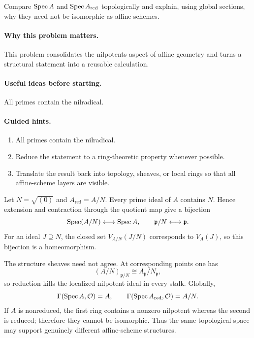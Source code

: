 \begin{problem}\label{prob:vi18-p11}
Compare $\operatorname{Spec} A$ and $\operatorname{Spec} A_{\mathrm{red}}$ topologically and explain, using global sections, why they need not be isomorphic as affine schemes.
\end{problem}

\ifdefined\FullProblemDossiers
\paragraph{Why this problem matters.}
This problem consolidates the nilpotents aspect of affine geometry and turns a structural statement into a reusable calculation.

\paragraph{Useful ideas before starting.}
All primes contain the nilradical.

\paragraph{Guided hints.}
\begin{enumerate}
\item All primes contain the nilradical.
\item Reduce the statement to a ring-theoretic property whenever possible.
\item Translate the result back into topology, sheaves, or local rings so that all affine-scheme layers are visible.
\end{enumerate}

\begin{solution}
Let $N=\sqrt{(0)}$ and $A_{\mathrm{red}}=A/N$. Every prime ideal of $A$ contains $N$. Hence extension and contraction through the quotient map give a bijection
\[
\operatorname{Spec}(A/N)\longleftrightarrow\operatorname{Spec} A,
\qquad
\mathfrak p/N\longleftrightarrow\mathfrak p.
\]
For an ideal $J\supseteq N$, the closed set $V_{A/N}(J/N)$ corresponds to $V_A(J)$, so this bijection is a homeomorphism.

The structure sheaves need not agree. At corresponding points one has
\[
(A/N)_{\mathfrak p/N}\cong A_{\mathfrak p}/N_{\mathfrak p},
\]
so reduction kills the localized nilpotent ideal in every stalk. Globally,
\[
\Gamma(\operatorname{Spec} A,\mathcal O)=A,
\qquad
\Gamma(\operatorname{Spec} A_{\mathrm{red}},\mathcal O)=A/N.
\]
If $A$ is nonreduced, the first ring contains a nonzero nilpotent whereas the second is reduced; therefore they cannot be isomorphic. Thus the same topological space may support genuinely different affine-scheme structures.
\end{solution}


